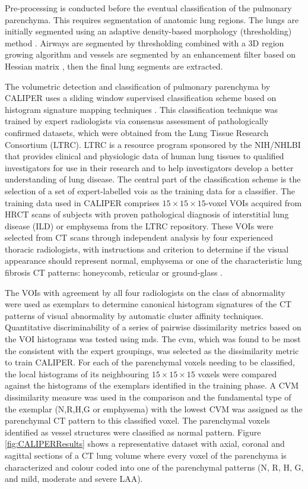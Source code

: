 Pre-processing is conducted before the eventual classification of the pulmonary parenchyma. This requires segmentation of anatomic lung regions. The lungs are initially segmented using an adaptive density-based morphology (thresholding) method \citep{hu2001automatic}. Airways are segmented by thresholding combined with a 3D region growing algorithm and vessels are segmented by an enhancement filter based on Hessian matrix \citep{sato2000tissue}, then the final lung segments are extracted. 

The volumetric detection and classification of pulmonary parenchyma by CALIPER uses a sliding window supervised classification scheme based on histogram signature mapping techniques \citep{zavaletta2007high}. This classification technique was trained by expert radiologists via consensus assessment of pathologically confirmed datasets, which were obtained from the Lung Tissue Research Consortium (LTRC). LTRC is a resource program sponsored by the NIH/NHLBI that provides clinical and physiologic data of human lung tissues to qualified investigators for use in their research and to help investigators develop a better understanding of lung disease. The central part of the classification scheme is the selection of a set of expert-labelled \gls{vois} as the training data for a classifier. The training data used in CALIPER comprises $15 \times 15 \times 15$-voxel VOIs acquired from HRCT scans of subjects with proven pathological diagnosis of interstitial lung disease (ILD) or emphysema from the LTRC repository. These VOIs were selected from CT scans through independent analysis by four experienced thoracic radiologists, with instructions and criterion to determine if the visual appearance should represent normal, emphysema or one of the characteristic lung fibrosis CT patterns: honeycomb, reticular or ground-glass \citep{maldonado2013automated,bartholmai2013quantitative}.

The VOIs with agreement by all four radiologists on the class of abnormality were used as exemplars to determine canonical histogram signatures of the CT patterns of visual abnormality by automatic cluster affinity techniques. Quantitative discriminability of a series of pairwise dissimilarity metrics based on the VOI histograms was tested using \gls{mds}. The \gls{cvm}, which was found to be most the consistent with the expert groupings, was selected as the dissimilarity metric to train CALIPER. For each of the parenchymal voxels needing to be classified, the local histograms of its neighbouring $15 \times 15 \times 15$ voxels were compared against the histograms of the exemplars identified in the training phase. A CVM dissimilarity measure was used in the comparison and the fundamental type of the exemplar (N,R,H,G or emphysema) with the lowest CVM was assigned as the parenchymal CT pattern to this classified voxel. The parenchymal voxels identified as vessel structures were classified as normal pattern. Figure \ref{fig:CALIPERResults} shows a representative dataset with axial, coronal and sagittal sections of a CT lung volume where every voxel of the parenchyma is characterized and colour coded into one of the parenchymal patterns (N, R, H, G, and mild, moderate and severe LAA). 

